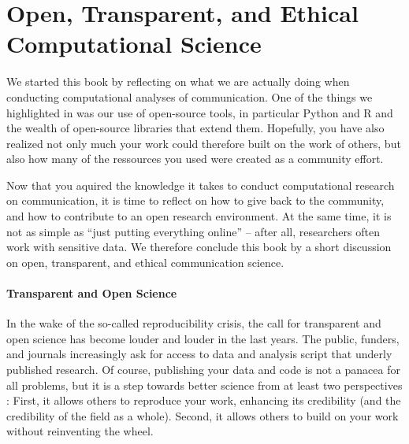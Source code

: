 


\section{Open, Transparent, and Ethical Computational Science}
\label{sec:ethics}


We started this book by reflecting on what we are actually doing when conducting computational analyses of communication.
One of the things we highlighted in  was our use of open-source tools, in particular Python and R
and the wealth of open-source libraries that extend them. Hopefully, you have also realized not only much your work could
therefore built on the work of others, but also how many of the ressources you used were created as a community effort.

Now that you aquired the knowledge it takes to conduct computational research on communication, it is time to reflect
on how to give back to the community, and how to contribute to an open research environment. At the same time, it is
not as simple as ``just putting everything online'' -- after all, researchers often work with sensitive data. We therefore
conclude this book by a short discussion on open, transparent, and ethical communication science.


\paragraph{Transparent and Open Science}
In the wake of the so-called reproducibility crisis, the call for transparent and open science has become louder and louder
in the last years. The public, funders, and journals increasingly ask for access to data and analysis script that underly
published research. Of course, publishing your data and code is not a panacea for all problems, but it is a step towards
better science from at least two perspectives \citep{VanAtteveldt2019}: First, it allows others to reproduce your work, enhancing its credibility
(and the credibility of the field as a whole). Second, it allows others to build on your work without reinventing the wheel.

